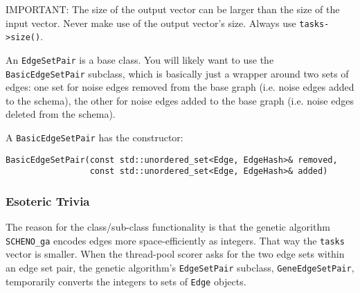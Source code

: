 \documentclass{article}
\begin{document}
IMPORTANT: The size of the output vector can be larger than the size of the input vector. Never make use of the output vector's size. Always use \verb|tasks->size()|.

An \verb|EdgeSetPair| is a base class. You will likely want to use the \verb|BasicEdgeSetPair| subclass, which is basically just a wrapper around two sets of edges: one set for noise edges removed from the base graph (i.e. noise edges added to the schema), the other for noise edges added to the base graph (i.e. noise edges deleted from the schema).

A \verb|BasicEdgeSetPair| has the constructor:

\begin{verbatim}
BasicEdgeSetPair(const std::unordered_set<Edge, EdgeHash>& removed,
                 const std::unordered_set<Edge, EdgeHash>& added)
\end{verbatim}

\subsubsection{Esoteric Trivia}

The reason for the class/sub-class functionality is that the genetic algorithm \verb|SCHENO_ga| encodes edges more space-efficiently as integers. That way the \verb|tasks| vector is smaller. When the thread-pool scorer asks for the two edge sets within an edge set pair, the genetic algorithm's \verb|EdgeSetPair| subclass, \verb|GeneEdgeSetPair|, temporarily converts the integers to sets of \verb|Edge| objects.

% 
% 




\end{document}

